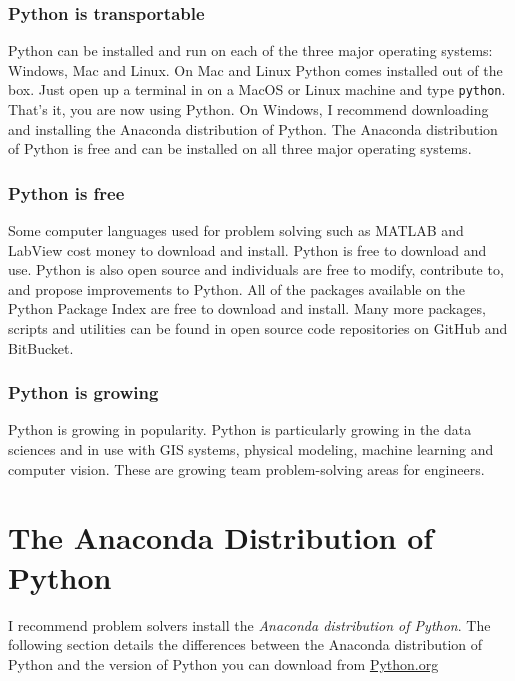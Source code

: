 \documentclass{book}
\begin{document}
\subsubsection{Python is transportable}\label{python-is-transportable}

Python can be installed and run on each of the three major operating
systems: Windows, Mac and Linux. On Mac and Linux Python comes installed
out of the box. Just open up a terminal in on a MacOS or Linux machine
and type \lstinline!python!. That's it, you are now using Python. On
Windows, I recommend downloading and installing the Anaconda
distribution of Python. The Anaconda distribution of Python is free and
can be installed on all three major operating systems.

\subsubsection{Python is free}\label{python-is-free}

Some computer languages used for problem solving such as MATLAB and
LabView cost money to download and install. Python is free to download
and use. Python is also open source and individuals are free to modify,
contribute to, and propose improvements to Python. All of the packages
available on the Python Package Index are free to download and install.
Many more packages, scripts and utilities can be found in open source
code repositories on GitHub and BitBucket.

\subsubsection{Python is growing}\label{python-is-growing}

Python is growing in popularity. Python is particularly growing in the
data sciences and in use with GIS systems, physical modeling, machine
learning and computer vision. These are growing team problem-solving
areas for engineers.
    




    
        \section{The Anaconda Distribution of
Python}\label{the-anaconda-distribution-of-python}
    




    
        I recommend problem solvers install the \emph{Anaconda distribution of
Python}. The following section details the differences between the
Anaconda distribution of Python and the version of Python you can
download from \href{https://python.org}{Python.org}
    
\end{document}
